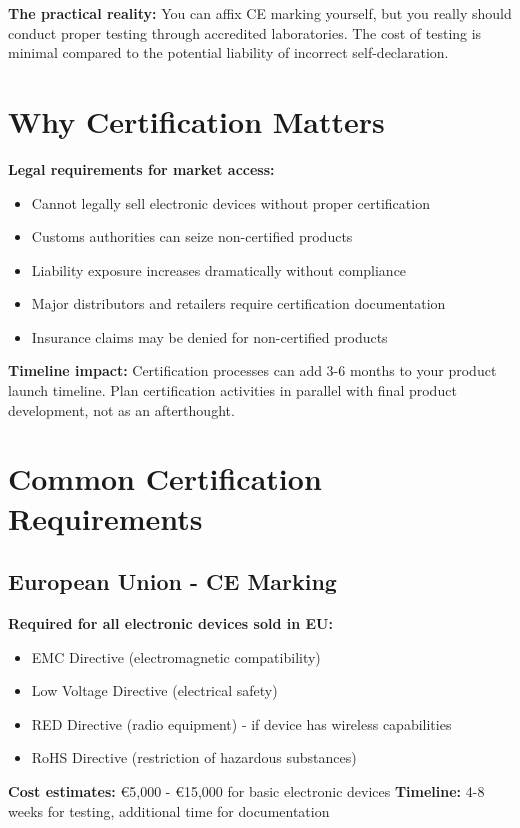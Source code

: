 \textbf{The practical reality:} You can affix CE marking yourself, but you really should conduct proper testing through accredited laboratories. The cost of testing is minimal compared to the potential liability of incorrect self-declaration.

\section{Why Certification Matters}

\textbf{Legal requirements for market access:}
\begin{itemize}
\item Cannot legally sell electronic devices without proper certification
\item Customs authorities can seize non-certified products
\item Liability exposure increases dramatically without compliance
\item Major distributors and retailers require certification documentation
\item Insurance claims may be denied for non-certified products
\end{itemize}

\textbf{Timeline impact:}
Certification processes can add 3-6 months to your product launch timeline. Plan certification activities in parallel with final product development, not as an afterthought.

\section{Common Certification Requirements}

\subsection{European Union - CE Marking}

\textbf{Required for all electronic devices sold in EU:}
\begin{itemize}
\item EMC Directive (electromagnetic compatibility)
\item Low Voltage Directive (electrical safety)
\item RED Directive (radio equipment) - if device has wireless capabilities
\item RoHS Directive (restriction of hazardous substances)
\end{itemize}

\textbf{Cost estimates:} €5,000 - €15,000 for basic electronic devices
\textbf{Timeline:} 4-8 weeks for testing, additional time for documentation

